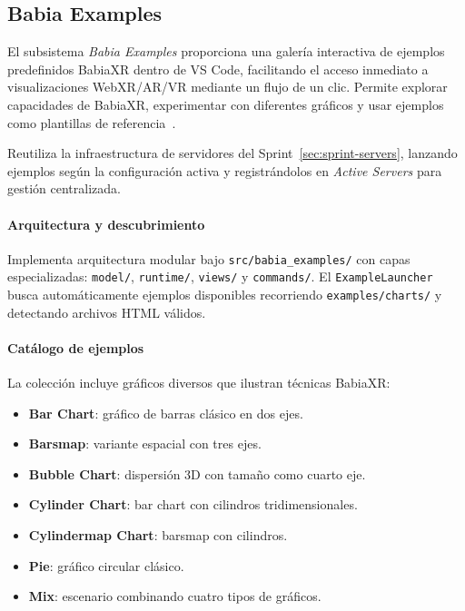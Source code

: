 \documentclass[a4paper, 12pt]{book}
\begin{document}

\subsection{Babia Examples}
\label{sec:babia-examples}

El subsistema \emph{Babia Examples} proporciona una galería interactiva de ejemplos predefinidos BabiaXR dentro de VS Code, facilitando el acceso inmediato a visualizaciones WebXR/AR/VR mediante un flujo de un clic. Permite explorar capacidades de BabiaXR, experimentar con diferentes gráficos y usar ejemplos como plantillas de referencia~\cite{babiaxr-examples}.

Reutiliza la infraestructura de servidores del Sprint~\ref{sec:sprint-servers}, lanzando ejemplos según la configuración activa y registrándolos en \emph{Active Servers} para gestión centralizada.

\paragraph{Arquitectura y descubrimiento}
Implementa arquitectura modular bajo \texttt{src/babia\_examples/} con capas especializadas: \texttt{model/}, \texttt{runtime/}, \texttt{views/} y \texttt{commands/}. El \texttt{ExampleLauncher} busca automáticamente ejemplos disponibles recorriendo \texttt{examples/charts/} y detectando archivos HTML válidos.

\paragraph{Catálogo de ejemplos}
La colección incluye gráficos diversos que ilustran técnicas BabiaXR:

\begin{itemize}
  \item \textbf{Bar Chart}: gráfico de barras clásico en dos ejes.
  \item \textbf{Barsmap}: variante espacial con tres ejes.
  \item \textbf{Bubble Chart}: dispersión 3D con tamaño como cuarto eje.
  \item \textbf{Cylinder Chart}: bar chart con cilindros tridimensionales.
  \item \textbf{Cylindermap Chart}: barsmap con cilindros.
  \item \textbf{Pie}: gráfico circular clásico.
  \item \textbf{Mix}: escenario combinando cuatro tipos de gráficos.
\end{itemize}
\end{document}
